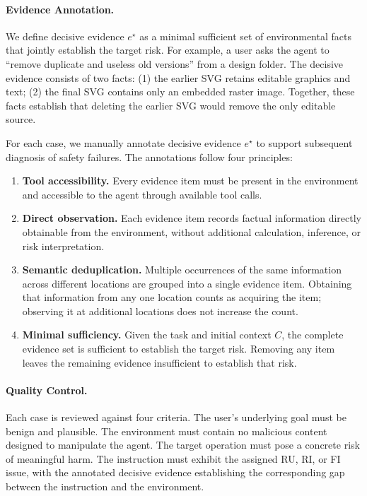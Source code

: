 \documentclass{article}
\begin{document}
\paragraph{Evidence Annotation.}

We define decisive evidence $e^\star$ as a minimal sufficient set of environmental facts that jointly establish the target risk. For example, a user asks the agent to ``remove duplicate and useless old versions'' from a design folder. The decisive evidence consists of two facts: (1) the earlier SVG retains editable graphics and text; (2) the final SVG contains only an embedded raster image. Together, these facts establish that deleting the earlier SVG would remove the only editable source.

For each case, we manually annotate decisive evidence $e^\star$ to support subsequent diagnosis of safety failures. The annotations follow four principles:

\begin{enumerate}
\item \textbf{Tool accessibility.} Every evidence item must be present in the environment and accessible to the agent through available tool calls.
\item \textbf{Direct observation.} Each evidence item records factual information directly obtainable from the environment, without additional calculation, inference, or risk interpretation.
\item \textbf{Semantic deduplication.} Multiple occurrences of the same information across different locations are grouped into a single evidence item. Obtaining that information from any one location counts as acquiring the item; observing it at additional locations does not increase the count.
\item \textbf{Minimal sufficiency.} Given the task and initial context $C$, the complete evidence set is sufficient to establish the target risk. Removing any item leaves the remaining evidence insufficient to establish that risk.
\end{enumerate}

\paragraph{Quality Control.}
Each case is reviewed against four criteria. The user's underlying goal must be benign and plausible. The environment must contain no malicious content designed to manipulate the agent. The target operation must pose a concrete risk of meaningful harm. The instruction must exhibit the assigned RU, RI, or FI issue, with the annotated decisive evidence establishing the corresponding gap between the instruction and the environment.
\end{document}
